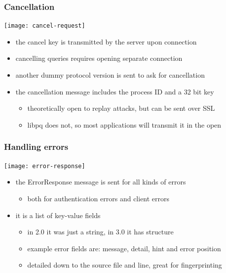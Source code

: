 \documentclass{beamer}
\begin{document}
\begin{frame}
  \frametitle{Cancellation}

  \begin{center}
    \texttt{[image: cancel-request]}
  \end{center}

  \begin{itemize}
  \item the \alert{cancel key} is transmitted by the server upon connection
  \item cancelling queries requires opening \alert{separate connection}
  \item another dummy protocol version is sent to ask for cancellation
  \item the cancellation message includes the process ID and a 32 bit key
    \begin{itemize}
    \item theoretically open to \alert{replay attacks}, but can be sent over
      SSL
    \item libpq \alert{does not}, so most applications will transmit it in the
      open
    \end{itemize}
  \end{itemize}
\end{frame}

\begin{frame}
  \frametitle{Handling errors}

  \begin{center}
    \texttt{[image: error-response]}
  \end{center}

  \begin{itemize}
  \item the ErrorResponse message is sent for all kinds of errors
    \begin{itemize}
    \item both for authentication errors and client errors
    \end{itemize}
  \item it is a list of key-value fields
    \begin{itemize}
    \item in 2.0 it was just a string, in 3.0 it has structure
    \item example error fields are: message, detail, hint and error position
    \item detailed down to the source file and line, great for fingerprinting
    \end{itemize}
  \end{itemize}
\end{frame}
\end{document}
